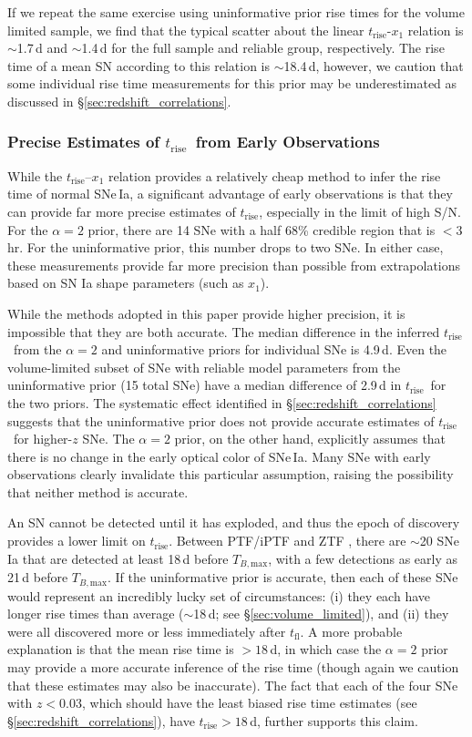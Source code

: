 \documentclass[twocolumn]{./aastex63}
\newcommand{\tfl}{$t_\mathrm{fl}$}
\newcommand{\trise}{$t_\mathrm{rise}$}
\newcommand{\tbmax}{$T_{B,\mathrm{max}}$}
\begin{document}
If we repeat the same exercise using uninformative prior rise times for the
volume limited sample, we find that the typical scatter about the linear
\trise-$x_1$ relation is $\sim$1.7\,d and $\sim$1.4\,d for the full sample and
reliable group, respectively. The rise time of a mean SN according to this
relation is $\sim$18.4\,d, however, we caution that some individual
rise time measurements for this prior may be underestimated as discussed in
\S\ref{sec:redshift_correlations}.

\subsubsection{Precise Estimates of \trise\ from Early Observations}

While the \trise--$x_1$ relation provides a relatively cheap method to infer
the rise time of normal SNe\,Ia, a significant advantage of early observations
is that they can provide far more precise estimates of \trise, especially in
the limit of high S/N. For the $\alpha = 2$ prior, there are 14 SNe with a half
68\% credible region that is $< 3$\,hr. For the uninformative prior, this
number drops to two SNe. In either case, these measurements provide far more
precision than possible from extrapolations based on SN Ia shape parameters
(such as $x_1$).

While the methods adopted in this paper provide higher precision, it is
impossible that they are both accurate. The median difference in the inferred
\trise\ from the $\alpha = 2$ and uninformative priors for individual SNe is
4.9\,d. Even the volume-limited subset of SNe with reliable model parameters
from the uninformative prior (15 total SNe) have a median difference of 2.9\,d
in \trise\ for the two priors. The systematic effect identified in
\S\ref{sec:redshift_correlations} suggests that the uninformative prior does
not provide accurate estimates of \trise\ for higher-$z$ SNe. The $\alpha = 2$
prior, on the other hand, explicitly assumes that there is no change in the
early optical color of SNe\,Ia. Many SNe with early observations clearly
invalidate this particular assumption, raising the possibility that neither
method is accurate.

An SN cannot be detected until it has exploded, and thus the epoch of discovery
provides a lower limit on \trise. Between PTF/iPTF \citep{Papadogiannakis19}
and ZTF \citep{Yao19}, there are $\sim$20 SNe\,Ia that are detected at least
18\,d before \tbmax, with a few detections as early as 21\,d before \tbmax. If
the uninformative prior is accurate, then each of these SNe would represent an
incredibly lucky set of circumstances: (i) they each have longer rise times
than average ($\sim$18\,d; see \S\ref{sec:volume_limited}), and (ii) they were
all discovered more or less immediately after \tfl. A more probable
explanation is that the mean rise time is $> 18$\,d, in which case the $\alpha
= 2$ prior may provide a more accurate inference of the rise time (though
again we caution that these estimates may also be inaccurate). The fact that
each of the four SNe with $z < 0.03$, which should have the least biased rise
time estimates (see \S\ref{sec:redshift_correlations}), have \trise$ > 18$\,d,
further supports this claim.
\end{document}

